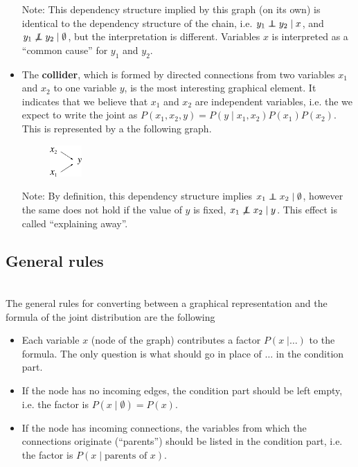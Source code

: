 \begin{itemize}
	Note: This dependency structure implied by this graph (on its own) is identical to the dependency structure of the chain, i.e. $y_1 \independent y_2 \;|\;x$, and $y_1 \not\independent y_2\; | \; \emptyset$, but the interpretation is different. Variables $x$ is interpreted as a ``common cause'' for $y_1$ and $y_2$.

	\item The {\bf collider}, which is formed by directed connections from two variables $x_1$ and $x_2$ to one variable $y$, is the most interesting graphical element. It indicates that we believe that $x_1$ and $x_2$ are independent variables, i.e. the we expect to write the joint as $P(x_1, x_2, y) = P(y\;|\;x_1, x_2) P(x_1) P(x_2)$. This is represented by a the following graph.
	\begin{figure}[h!]
	\centering
		\includegraphics[height=12mm]{./figs/04-x1x2y.pdf} 
	\end{figure}

	Note: By definition, this dependency structure implies $x_1 \independent x_2\;|\;\emptyset$, however the same does not hold if the value of $y$ is fixed, $x_1 \not\independent x_2\;|\;y$. This effect is called ``explaining away''.
	
\end{itemize}

\subsection{General rules}

\\ 
The general rules for converting between a graphical representation and the formula of the joint distribution are the following
\begin{itemize}
	\item Each variable $x$ (node of the graph) contributes a factor $P(x\;|\ldots)$ to the formula. The only question is what should go in place of $\ldots$ in the condition part.

	\item If the node has no incoming edges, the condition part should be left empty, i.e. the factor is $P(x\;|\;\emptyset) = P(x)$.

	\item If the node has incoming connections, the variables from which the connections originate (``parents'') should be listed in the condition part, i.e. the factor is $P(x\;|\;\text{parents of }x)$.
\end{itemize}


